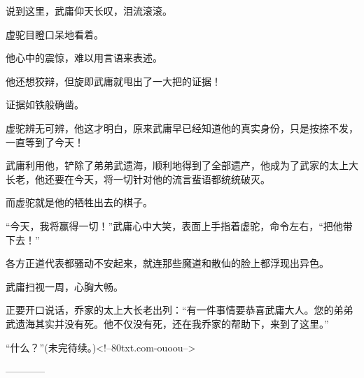 \begin{this_body}
说到这里，武庸仰天长叹，泪流滚滚。

虚驼目瞪口呆地看着。

他心中的震惊，难以用言语来表述。

他还想狡辩，但旋即武庸就甩出了一大把的证据！

证据如铁般确凿。

虚驼辨无可辨，他这才明白，原来武庸早已经知道他的真实身份，只是按捺不发，一直等到了今天！

武庸利用他，铲除了弟弟武遗海，顺利地得到了全部遗产，他成为了武家的太上大长老，他还要在今天，将一切针对他的流言蜚语都统统破灭。

而虚驼就是他的牺牲出去的棋子。

“今天，我将赢得一切！”武庸心中大笑，表面上手指着虚驼，命令左右，“把他带下去！”

各方正道代表都骚动不安起来，就连那些魔道和散仙的脸上都浮现出异色。

武庸扫视一周，心胸大畅。

正要开口说话，乔家的太上大长老出列：“有一件事情要恭喜武庸大人。您的弟弟武遗海其实并没有死。他不仅没有死，还在我乔家的帮助下，来到了这里。”

“什么？”(未完待续。)<!--80txt.com-ouoou-->

------------

\end{this_body}

